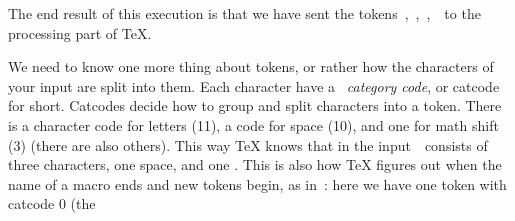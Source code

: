 The end result of this execution is that we have sent the
tokens~,~,~,~~to the processing part of
TeX.

\stopsectionlevel

\stopsectionlevel

\startsectionlevel[title={A Primer on
Catcodes},reference={a-primer-on-catcodes}]

We need to know one more thing about tokens, or rather how the
characters of your input are split into them. Each character have a~{\em
category code}, or catcode for short. Catcodes decide how to group and
split characters into a token. There is a character code for letters
(11), a code for space (10), and one for math shift (3) (there are also
others). This way TeX knows that in the input~~consists of
three characters, one space, and one . This is
also how TeX figures out when the name of a macro ends and new tokens
begin, as in~: here we have one token with catcode 0 (the
